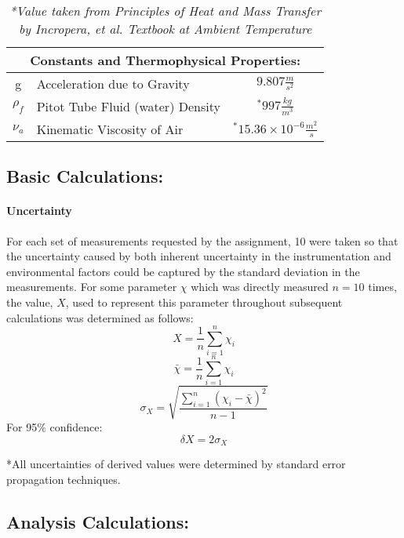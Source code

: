 \documentclass[12pt]{article}
\begin{document}
	\hfill\break\break
	\begin{table}
		\centering
		{
		\begin{tabular}{|c|l|c|}
		\hline
			\multicolumn{3}{|c|}{\textbf{Constants and Thermophysical Properties:}} \\
		\hline
		\hline
			g & Acceleration due to Gravity & $9.807\frac{m}{s^2}$\\
			$\rho_f$ & Pitot Tube Fluid (water) Density & $^*997\frac{kg}{m^3}$\\
			$\nu_a$ & Kinematic Viscosity of Air & $^*15.36\times10^{-6}\frac{m^2}{s}$\\
		\hline
		\end{tabular}
		}
		\caption*{\textit{*Value taken from \em{Principles of Heat and Mass Transfer by Incropera, et al.} Textbook at Ambient Temperature}}
	\end{table}


	\subsection{Basic Calculations:}
	\paragraph{Uncertainty} For each set of measurements requested by the assignment, 10 were taken so that the uncertainty caused by both inherent uncertainty in the instrumentation and environmental factors could be captured by the standard deviation in the measurements.\hfill\break 
	For some parameter $\chi$ which was directly measured $n=10$ times, the value, $X$, used to represent this parameter throughout subsequent calculations was determined as follows:
	\begin{equation}
		X = \frac{1}{n}\sum_{i=1}^{n}{\chi_i}
	\end{equation}
	$$\bar{\chi} = \frac{1}{n}\sum_{i=1}^{n}{\chi_i}$$
	$$\sigma_X = \sqrt{\frac{\sum_{i=1}^{n}{(\chi_i-\bar{\chi})^2}}{n-1}}$$
	For 95\% confidence:
	\begin{equation}
		\delta X = 2\sigma_X
	\end{equation}
	
	*All uncertainties of derived values were determined by standard error propagation techniques.
	
	\subsection{Analysis Calculations:}
\end{document}
